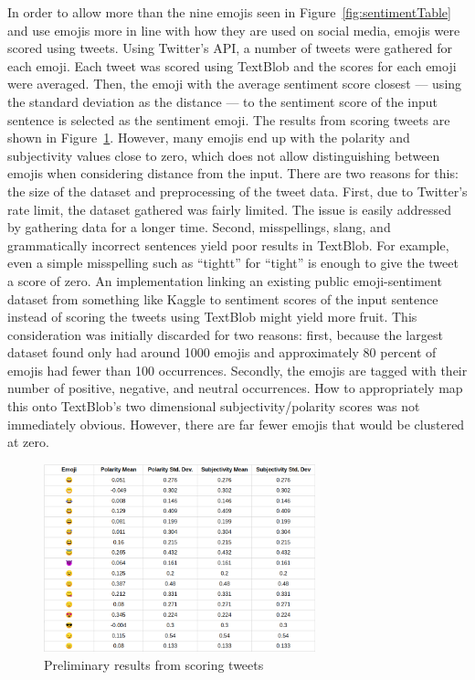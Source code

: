 \documentclass{article}[10]
\begin{document}
In order to allow more than the nine emojis seen in Figure~{\ref{fig:sentimentTable}} and use emojis more in line with how they are used on social media, emojis were scored using tweets. Using Twitter's API, a number of tweets were gathered for each emoji. Each tweet was scored using TextBlob and the scores for each emoji were averaged. Then, the emoji with the average sentiment score closest --- using the standard deviation as the distance --- to the sentiment score of the input sentence is selected as the sentiment emoji. The results from scoring tweets are shown in Figure~\ref{fig:tweetScoring}. However, many emojis end up with the polarity and subjectivity values close to zero, which does not allow distinguishing between emojis when considering distance from the input. There are two reasons for this: the size of the dataset and preprocessing of the tweet data. First, due to Twitter's rate limit, the dataset gathered was fairly limited. The issue is easily addressed by gathering data for a longer time. Second, misspellings, slang, and grammatically incorrect sentences yield poor results in TextBlob. For example, even a simple misspelling such as ``tightt'' for ``tight'' is enough to give the tweet a score of zero. An implementation linking an existing public emoji-sentiment dataset from something  like Kaggle to sentiment scores of the input sentence instead of scoring the tweets using TextBlob might yield more fruit. This consideration was initially discarded for two reasons: first, because the largest dataset found only had around 1000 emojis and approximately 80 percent of emojis had fewer than 100 occurrences. Secondly, the emojis are tagged with their number of positive, negative, and neutral occurrences. How to appropriately map this onto TextBlob's two dimensional subjectivity/polarity scores was not immediately obvious. However, there are far fewer emojis that would be clustered at zero.

\begin{figure}[h]
  \begin{center}
    \includegraphics[width=0.70\textwidth]{figures/sentiment_results1.png}
    \caption{Preliminary results from scoring tweets\label{fig:tweetScoring}}
  \end{center}
\end{figure}
\end{document}
